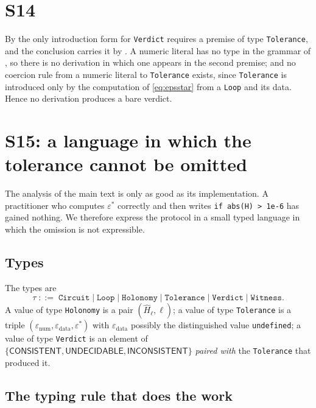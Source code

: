 \documentclass[11pt,a4paper]{article}
\theoremstyle{definition}
\theoremstyle{remark}
\newcommand{\eps}{\varepsilon}
\newcommand{\epsnum}{\eps_{\mathrm{num}}}
\newcommand{\epsdata}{\eps_{\mathrm{data}}}
\newcommand{\epsstar}{\eps^{\ast}}
\newcommand{\hol}{H}
\newcommand{\cf}[1]{\texttt{#1}}
\begin{document}
\section*{S14}
By  the only introduction form for \cf{Verdict}
requires a premise of type \cf{Tolerance}, and the conclusion carries it
by . A numeric literal has no type in the grammar of
, so there is no derivation in which one appears in
the second premise; and no coercion rule from a numeric literal to
\cf{Tolerance} exists, since \cf{Tolerance} is introduced only by the
computation of \eqref{eq:epsstar} from a \cf{Loop} and its data. Hence
no derivation produces a bare verdict.



\section*{S15: a language in which the tolerance cannot be omitted}

The analysis of the main text is only as good as its
implementation. A practitioner who computes $\epsstar$ correctly and then writes
\verb|if abs(H) > 1e-6| has gained nothing. We therefore express the
protocol in a small typed language in which the omission is not
expressible.

\subsection*{Types}

\begin{definition}[Types]
\label{def:types}
The types are
\[
  \tau \;::=\; \cf{Circuit} \mid \cf{Loop} \mid \cf{Holonomy}
  \mid \cf{Tolerance} \mid \cf{Verdict} \mid \cf{Witness}.
\]
A value of type \cf{Holonomy} is a pair $(\widehat{\hol}_\ell,\ell)$; a
value of type \cf{Tolerance} is a triple
$(\epsnum,\epsdata,\epsstar)$ with $\epsdata$ possibly the distinguished
value \cf{undefined}; a value of type \cf{Verdict} is an element of
$\{\textsf{CONSISTENT},\textsf{UNDECIDABLE},\textsf{INCONSISTENT}\}$
\emph{paired with} the \cf{Tolerance} that produced it.
\end{definition}

\subsection*{The typing rule that does the work}
\end{document}
